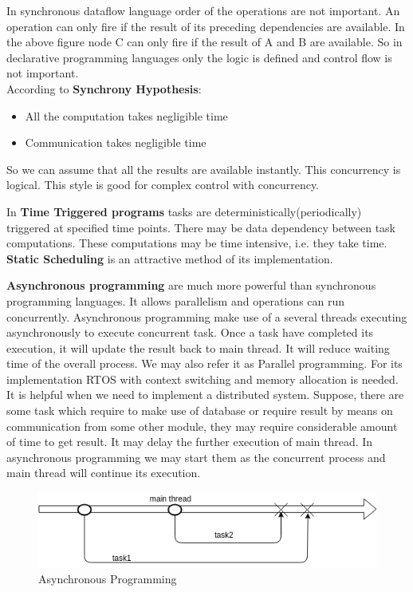 \documentclass[16pt]{report}
\begin{document}
In synchronous dataflow language order of the operations are not important. An operation can only fire if the result of its preceding dependencies are available. In the above figure node C can only fire if the result of A and B are available. So in declarative programming languages only the logic is defined and control flow is not important. \\
\noindent
According to \textbf{Synchrony Hypothesis}:
\begin{itemize}
    \item All the computation takes negligible time
    \item Communication takes negligible time
\end{itemize}
So we can assume that all the results are available instantly. This concurrency is logical. This style is good for complex control with concurrency.

In \textbf{Time Triggered programs} tasks are deterministically(periodically) triggered at specified time points. There may be data dependency between task computations. These computations may be time intensive, i.e. they take time. \textbf{Static Scheduling} is an attractive method of its implementation.

\textbf{Asynchronous programming} are much more powerful than synchronous programming languages. It allows parallelism and operations can run concurrently. Asynchronous programming make use of a several threads executing asynchronously to execute concurrent task. Once a task have completed its execution, it will update the result back to main thread. It will reduce waiting time of the overall process. We may also refer it as Parallel programming. For its implementation RTOS with context switching and memory allocation is needed.\\
It is helpful when we need to implement a distributed system. Suppose, there are some task which require to make use of database or require result by means on communication from some other module, they may require considerable amount of time to get result. It may delay the further execution of main thread. In asynchronous programming we may start them as the concurrent process and main thread will continue its execution. \\ 




\begin{figure}[H]
\centering
\includegraphics[width=\linewidth]{fig10.png}
\caption{Asynchronous Programming}
\end{figure}
\end{document}
